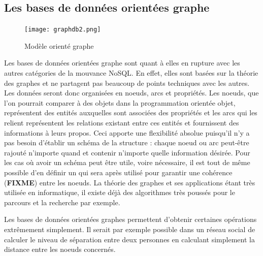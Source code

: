 \documentclass[11pt]{article}
\begin{document}
\subsection{Les bases de données orientées graphe}
\begin{figure}[H]
  \centering
  \begin{center}
    \texttt{[image: graphdb2.png]}
  \end{center}
  \caption{Modèle orienté graphe\cite{neo4jwebsite}}
\end{figure}
Les bases de données orientées graphe sont quant à elles en rupture avec les autres catégories de la mouvance NoSQL. En effet, elles sont basées sur la théorie des graphes et ne partagent pas beaucoup de points techniques avec les autres. Les données seront donc organisées en noeuds, arcs et propriétés. 
Les noeuds, que l'on pourrait comparer à des objets dans la programmation orientée objet, représentent des entités auxquelles sont associées des propriétés et les arcs qui les relient représentent les relations existant entre ces entités et fournissent des informations à leurs propos. Ceci apporte une flexibilité absolue puisqu'il n'y a pas besoin d'établir un schéma de la structure : chaque noeud ou arc peut-être rajouté n'importe quand et contenir n'importe quelle information désirée. Pour les cas où avoir un schéma peut être utile, voire nécessaire, il est tout de même possible d'en définir un qui sera après utilisé pour garantir une cohérence (\colorbox{BrickRed}{\textbf{FIXME}}) entre les noeuds. La théorie des graphes et ses applications étant très utilisée en informatique, il existe déjà des algorithmes très poussés pour le parcours et la recherche par exemple.

Les bases de données orientées graphes permettent d'obtenir certaines opérations extrêmement simplement. Il serait par exemple possible dans un réseau social de calculer le niveau de séparation entre deux personnes en calculant simplement la distance entre les noeuds concernés.
\end{document}
